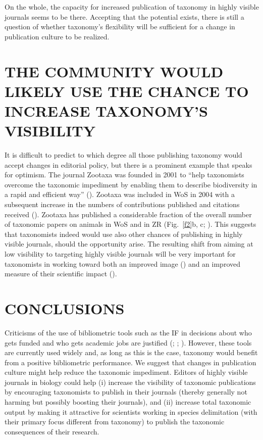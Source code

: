 \documentclass[webpdf,PV,mynatbib,surname,CE,MSC]{SYS-PV}
\begin{document}
On the whole, the capacity for increased publication of taxonomy in highly visible journals seems
to be there. Accepting that the potential exists, there is still a question of whether taxonomy's
flexibility will be sufficient for a change in publication culture to be realized.

\section*{T{\sc HE} C{\sc OMMUNITY} W{\sc OULD} L{\sc IKELY} U{\sc SE THE} C{\sc HANCE
TO} I{\sc NCREASE} T{\sc AXONOMY'S} V{\sc ISIBILITY}}

It is difficult to predict to which degree all those publishing taxonomy would accept changes in
editorial policy, but there is a prominent example that speaks for optimism. The journal Zootaxa
was founded in 2001 to ``help taxonomists overcome the taxonomic impediment by enabling them to
describe biodiversity in a rapid and efficient way'' (\citealt{59Zhang2011}). Zootaxa was included
in WoS in 2004 with a subsequent increase in the numbers of contributions published and citations
received (\citealt{59Zhang2011}). Zootaxa has published a considerable fraction of the overall
number of taxonomic papers on animals in WoS and in ZR (Fig.~\ref{f2}b, c;
\citealt{49Tancoigne2013}). This suggests that taxonomists indeed would use also other chances of
publishing in highly visible journals, should the opportunity arise. The resulting shift from
aiming at low visibility to targeting highly visible journals will be very important for
taxonomists in working toward both an improved image (\citealt{15Carbayo2011}) and an improved
measure of their scientific impact (\citealt{3Agnarsson2007}).

\section*{C{\sc ONCLUSIONS}}

Criticisms of the use of bibliometric tools such as the IF in decisions about who gets funded and
who gets academic jobs are justified (\citealt{6Benitez2014}; \citealt{22Erikson2014};
\citealt{39Pyke2014}). However, these tools are currently used widely and, as long as this is the
case, taxonomy would benefit from a positive bibliometric performance. We suggest that changes in
publication culture might help reduce the taxonomic impediment. Editors of highly visible journals
in biology could help (i) increase the visibility of taxonomic publications by encouraging
taxonomists to publish in their journals (thereby generally not harming but possibly boosting
their journals), and (ii) increase total taxonomic output by making it attractive for scientists
working in species delimitation (with their primary focus different from taxonomy) to publish the
taxonomic consequences of their research.
\end{document}
